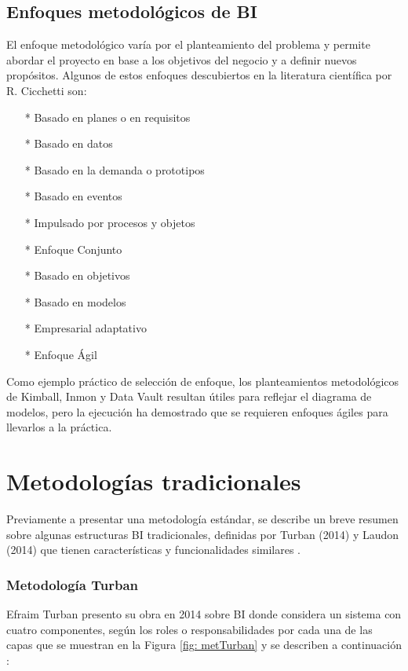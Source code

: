 \documentclass[12pt,jou]{apa7}
\begin{document}
\subsection{Enfoques metodológicos de BI}

El enfoque metodológico varía por el planteamiento del problema y permite abordar el proyecto en base a los objetivos del negocio y a definir nuevos propósitos. Algunos de estos enfoques descubiertos en la literatura científica por R. Cicchetti \cite{datap} son:
\begin{itemize}
\item[*] Basado en planes o en requisitos
\item[*] Basado en datos
\item[*] Basado en la demanda o prototipos
\item[*] Basado en eventos
\item[*] Impulsado por procesos y objetos
\item[*] Enfoque Conjunto
\item[*] Basado en objetivos
\item[*] Basado en modelos
\item[*] Empresarial adaptativo
\item[*] Enfoque Ágil
\end{itemize} 

Como ejemplo práctico de selección de enfoque, los planteamientos metodológicos de Kimball, Inmon y Data Vault resultan útiles para reflejar el diagrama de modelos, pero la ejecución ha demostrado que se requieren enfoques ágiles para llevarlos a la práctica.

\section{Metodologías tradicionales}
Previamente a presentar una metodología estándar, se describe un breve resumen sobre algunas estructuras BI tradicionales, definidas por Turban (2014) y Laudon (2014) que tienen características y funcionalidades similares \cite{Joyanes}.

\subsubsection{Metodología Turban}
Efraim Turban presento su obra en 2014 sobre BI donde considera un sistema con cuatro componentes, según los roles o responsabilidades por cada una de las capas que se muestran en la Figura \ref{fig: metTurban} y se describen a continuación \cite{Joyanes}:
\end{document}
